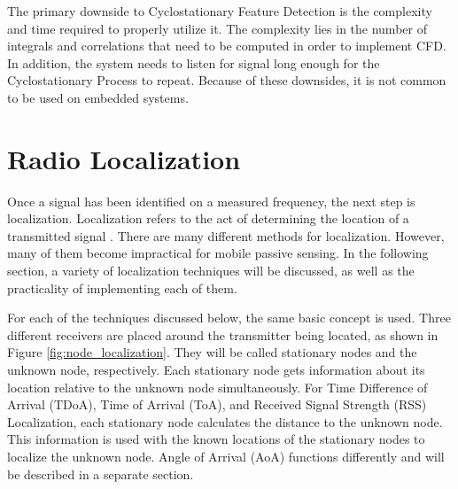 




The primary downside to Cyclostationary Feature Detection is the complexity and time required to properly utilize it. The complexity lies in the number of integrals and correlations that need to be computed in order to implement CFD. In addition, the system needs to listen for signal long enough for the Cyclostationary Process to repeat. Because of these downsides, it is not common to be used on embedded systems. \par


\section{Radio Localization}
Once a signal has been identified on a measured frequency, the next step is localization. Localization refers to the act of determining the location of a transmitted signal \cite{local_conf}. There are many different methods for localization. However, many of them become impractical for mobile passive sensing. In the following section, a variety of localization techniques will be discussed, as well as the practicality of implementing each of them.\par
For each of the techniques discussed below, the same basic concept is used. Three different receivers are placed around the transmitter being located, as shown in Figure \ref{fig:node_localization}.  They will be called stationary nodes and the unknown node, respectively. Each stationary node gets information about its location relative to the unknown node simultaneously. For Time Difference of Arrival (TDoA), Time of Arrival (ToA), and Received Signal Strength (RSS) Localization, each stationary node calculates the distance to the unknown node. This information is used with the known locations of the stationary nodes to localize the unknown node. Angle of Arrival (AoA) functions differently and will be described in a separate section. \par

